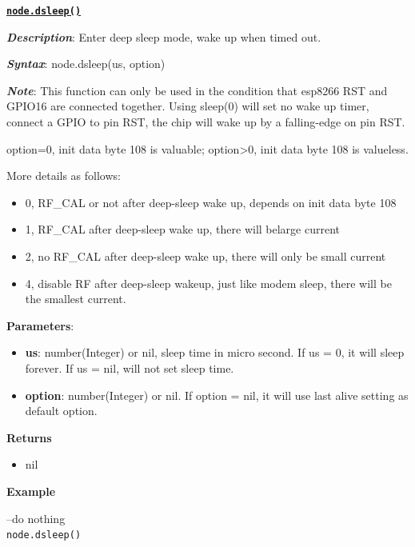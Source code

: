 \documentclass[16pt]{article}
\begin{document}
{\underline{\texttt{\textbf{node.dsleep()}}}}

\vspace{0.3cm}

\textbf{\emph{Description}}: Enter deep sleep mode, wake up when timed out.

\textbf{\emph{Syntax}}: node.dsleep(us, option)

\textbf{\emph{Note}}: This function can only be used in the condition that
esp8266 RST and GPIO16 are connected together. Using sleep(0) will set
no wake up timer, connect a GPIO to pin RST, the chip will wake up by a
falling-edge on pin RST.

option=0, init data byte 108 is valuable; option\textgreater{}0, init
data byte 108 is valueless.

More details as follows: 
\begin{itemize}
\item 0, RF\_CAL or not after deep-sleep wake up, depends on init data byte 108
\item 1, RF\_CAL after deep-sleep wake up, there will belarge current
\item 2, no RF\_CAL after deep-sleep wake up, there will only be small current 
\item 4, disable RF after deep-sleep wakeup, just like modem sleep, there will be the smallest current.
\end{itemize}

\textbf{Parameters}:

\begin{itemize}

\item
  \textbf{us}: number(Integer) or nil, sleep time in micro second. If us
  = 0, it will sleep forever. If us = nil, will not set sleep time.
\item
  \textbf{option}: number(Integer) or nil. If option = nil, it will use
  last alive setting as default option.
\end{itemize}

\textbf{Returns}

\begin{itemize}

\item
  nil
\end{itemize}

\textbf{Example}
\vspace{0.1cm}

--do nothing\\
\texttt{node.dsleep()}\\
\end{document}
